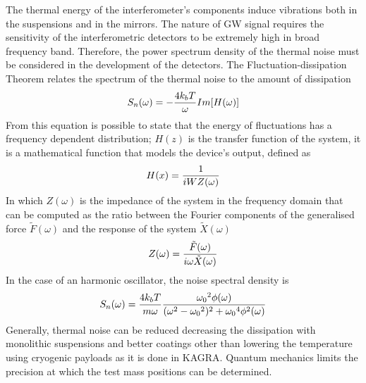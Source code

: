 \documentclass[binding=0.6cm, LaM]{sapthesis}
\begin{document}
        The thermal energy of the interferometer’s components induce vibrations both in the suspensions and in the mirrors.
        The nature of GW signal requires the sensitivity of the interferometric detectors
        to be extremely high in broad frequency band.
        Therefore, the power spectrum density of the thermal noise must be considered in the development of the detectors.
        The Fluctuation-dissipation Theorem relates the spectrum of the thermal noise to the amount of dissipation
        \begin{equation}
          S_{n}(\omega) = - {{4k_bT} \over {\omega}} Im[H(\omega)]
        \end{equation}
        From this equation is possible to state that the energy of fluctuations has a frequency dependent distribution;
        $H(z)$ is the transfer function of the system, it is a mathematical function that models the device’s output, defined as
        \begin{equation}
          H(x) = {1 \over {iWZ(\omega)}}
        \end{equation}
        In which $Z(\omega)$ is the impedance of the system in the frequency domain that can be computed as the ratio
        between the Fourier components of the generalised force $\tilde F(\omega)$ and the response of the system $\tilde X(\omega)$
        \begin{equation}
          Z(\omega) = {{\tilde F(\omega)} \over {i\omega \tilde X(\omega)}}
        \end{equation}
        In the case of an harmonic oscillator, the noise spectral density is
        \begin{equation}
          S_n(\omega) = {{4k_bT} \over {m\omega}} {{{\omega_0}^2 \phi(\omega)} \over {(\omega^2-{\omega_0}^2)^2 + {\omega_0}^4 \phi^2(\omega)}}
        \end{equation} 
	Generally, thermal noise can be reduced decreasing the dissipation with monolithic suspensions and better coatings
        other than lowering the temperature using cryogenic payloads as it is done in KAGRA.
        Quantum mechanics limits the precision at which the test mass positions can be determined.
\end{document}
